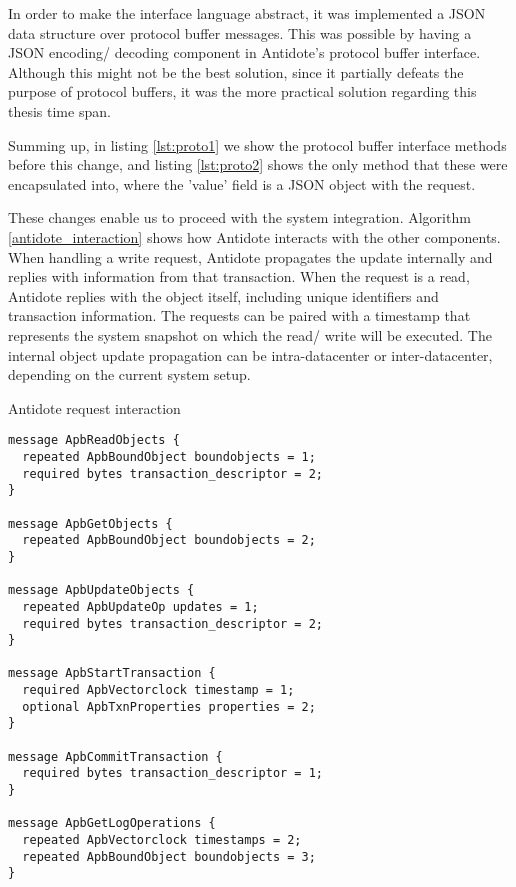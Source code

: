 	In order to make the interface language abstract, it was implemented a JSON data structure over protocol buffer messages. This was possible by having a JSON encoding/ decoding component in Antidote's protocol buffer interface. Although this might not be the best solution, since it partially defeats the purpose of protocol buffers, it was the more practical solution regarding this thesis time span.\par
	Summing up, in listing \ref{lst:proto1} we show the protocol buffer interface methods before this change, and listing \ref{lst:proto2} shows the only method that these were encapsulated into, where the 'value' field is a JSON object with the request.\par
	These changes enable us to proceed with the system integration. Algorithm \ref{antidote_interaction} shows how Antidote interacts with the other components. When handling a write request, Antidote propagates the update internally and replies with information from that transaction. When the request is a read, Antidote replies with the object itself, including unique identifiers and transaction information. The requests can be paired with a timestamp that represents the system snapshot on which the read/ write will be executed. The internal object update propagation can be intra-datacenter or inter-datacenter, depending on the current system setup.
	
\begin{algorithm}
\caption{Antidote request interaction}\label{antidote_interaction}
\begin{algorithmic}[1]
    \End
    \End
  \End
\End
\end{algorithmic}
\end{algorithm}

\begin{lstlisting}[caption={Protocol Buffer interface methods before},label={lst:proto1}]
message ApbReadObjects {
  repeated ApbBoundObject boundobjects = 1;
  required bytes transaction_descriptor = 2;
}

message ApbGetObjects {
  repeated ApbBoundObject boundobjects = 2;
}

message ApbUpdateObjects {
  repeated ApbUpdateOp updates = 1;
  required bytes transaction_descriptor = 2;
}

message ApbStartTransaction {
  required ApbVectorclock timestamp = 1;
  optional ApbTxnProperties properties = 2;
}

message ApbCommitTransaction {
  required bytes transaction_descriptor = 1;
}

message ApbGetLogOperations {
  repeated ApbVectorclock timestamps = 2;
  repeated ApbBoundObject boundobjects = 3;
}
\end{lstlisting}

